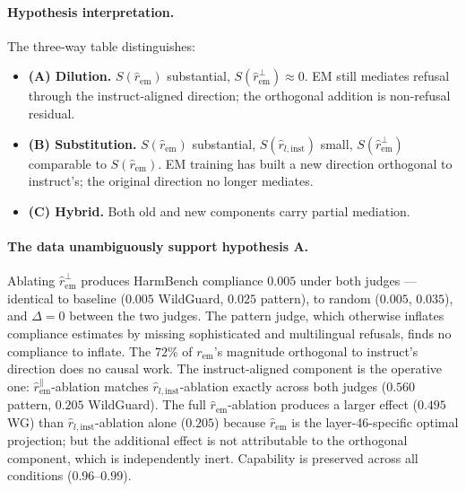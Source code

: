 \paragraph{Hypothesis interpretation.}
The three-way table distinguishes:
\begin{itemize}\itemsep=0pt
\item \textbf{(A) Dilution.} $S(\hat{r}_{\text{em}})$ substantial,
      $S(\hat{r}_{\text{em}}^\perp) \approx 0$. EM still mediates
      refusal through the instruct-aligned direction; the orthogonal
      addition is non-refusal residual.
\item \textbf{(B) Substitution.} $S(\hat{r}_{\text{em}})$
      substantial, $S(\hat{r}_{l,\text{inst}})$ small,
      $S(\hat{r}_{\text{em}}^\perp)$ comparable to
      $S(\hat{r}_{\text{em}})$. EM training has built a new
      direction orthogonal to instruct's; the original direction no
      longer mediates.
\item \textbf{(C) Hybrid.} Both old and new components carry
      partial mediation.
\end{itemize}

\paragraph{The data unambiguously support hypothesis A.}
Ablating $\hat{r}_{\text{em}}^\perp$ produces HarmBench compliance
$0.005$ under both judges --- identical to baseline ($0.005$
WildGuard, $0.025$ pattern), to random ($0.005$, $0.035$), and
$\Delta = 0$ between the two judges. The pattern judge, which
otherwise inflates compliance estimates by missing sophisticated
and multilingual refusals, finds no compliance to inflate. The
$72\%$ of $r_{\text{em}}$'s magnitude orthogonal to instruct's
direction does no causal work. The instruct-aligned component is
the operative one: $\hat{r}_{\text{em}}^\parallel$-ablation matches
$\hat{r}_{l,\text{inst}}$-ablation exactly across both judges
($0.560$ pattern, $0.205$ WildGuard). The full
$\hat{r}_{\text{em}}$-ablation produces a larger effect ($0.495$
WG) than $\hat{r}_{l,\text{inst}}$-ablation alone ($0.205$) because
$\hat{r}_{\text{em}}$ is the layer-46-specific optimal projection;
but the additional effect is not attributable to the orthogonal
component, which is independently inert. Capability is preserved
across all conditions ($0.96$--$0.99$).


